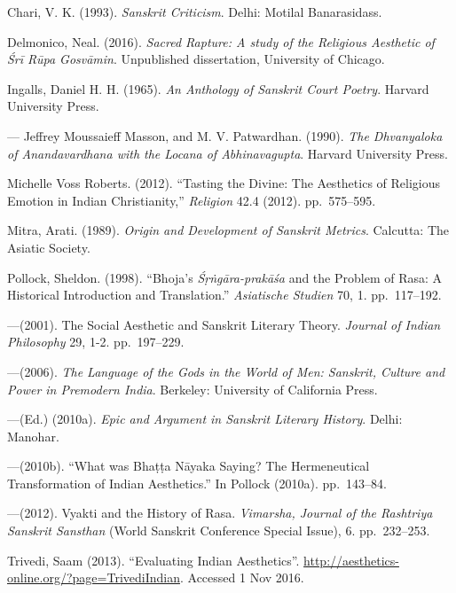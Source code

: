 \newpage

\begin{thebibliography}{99}
\itemsep=2pt
Chari, V. K. (1993). \textsl{Sanskrit Criticism}. Delhi: Motilal Banarasidass.

Delmonico, Neal. (2016). \textsl{Sacred Rapture: A study of the Religious Aesthetic of Śrī Rūpa Gosvāmin}. Unpublished dissertation, University of Chicago.

Ingalls, Daniel H. H. (1965). \textsl{An Anthology of Sanskrit Court Poetry}. Harvard University Press.

---\kern3pt Jeffrey Moussaieff Masson, and M. V. Patwardhan. (1990). \textsl{The Dhvanyaloka of Anandavardhana with the Locana of Abhinavagupta}. Harvard University Press.



Michelle Voss Roberts. (2012). ``Tasting the Divine: The Aesthetics of Religious Emotion in Indian Christianity,'' \textsl{Religion} 42.4 (2012). pp.~575--595.

Mitra, Arati. (1989). \textsl{Origin and Development of Sanskrit Metrics}. Calcutta: The Asiatic Society.

Pollock, Sheldon. (1998). ``Bhoja's \textsl{Śṛṅgāra-prakāśa} and the Problem of Rasa: A Historical Introduction and Translation.'' \textsl{Asiatische Studien} 70, 1. pp.~117--192. 

---\kern3pt(2001). The Social Aesthetic and Sanskrit Literary Theory. \textsl{Journal of Indian Philosophy} 29, 1-2. pp.~197--229.

---\kern3pt(2006). \textsl{The Language of the Gods in the World of Men: Sanskrit, Culture and Power in Premodern India}. Berkeley: University of California Press.

---\kern3pt(Ed.) (2010a). \textsl{Epic and Argument in Sanskrit Literary History}. Delhi: Manohar.

---\kern3pt(2010b). ``What was Bhaṭṭa Nāyaka Saying? The Hermeneutical Transformation of Indian Aesthetics.'' In Pollock (2010a). pp.~143--84.

---\kern3pt(2012). Vyakti and the History of Rasa. \textsl{Vimarsha, Journal of the Rashtriya Sanskrit Sansthan} (World Sanskrit Conference Special Issue), 6. pp.~232--253.

Trivedi, Saam (2013). ``Evaluating Indian Aesthetics''. \url{http://aesthetics-online.org/?page=TrivediIndian}. Accessed 1 Nov 2016.
\end{thebibliography}

\label{chapter\thechapter:end}
